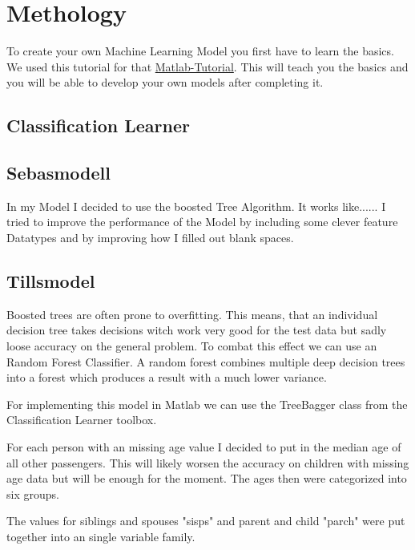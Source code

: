 \documentclass[
   10.5pt,
   invert-title=true,
   titlepage=false,
   titleimage-ratio=13,
   class=article
]{bfhpub}				%
\begin{document}
\section*{Methology}
To create your own Machine Learning Model you first have to learn the basics. We used this tutorial for that \href{https://blogs.mathworks.com/loren/2015/06/18/getting-started-with-kaggle-data-science-competitions/}{Matlab-Tutorial}.
This will teach you the basics and you will be able to develop your own models after completing it.

\subsection*{Classification Learner}

\subsection*{Sebasmodell}
In my Model I decided to use the boosted Tree Algorithm. It works like......
I tried to improve the performance of the Model by including some clever feature Datatypes and by improving how I filled out blank spaces.

\subsection*{Tillsmodel}
Boosted trees are often prone to overfitting. This means, that an individual decision tree takes decisions witch work very good for the test data but sadly loose accuracy on the general problem.
To combat this effect we can use an Random Forest Classifier. A random forest  combines multiple deep decision trees into a forest which produces a result with a much lower variance.

For implementing this model in Matlab we can use the TreeBagger class from the Classification Learner toolbox.

For each person with an missing age value I decided to put in the median age of all other passengers. This will likely worsen the accuracy on children with missing age data but will be enough for the moment. The ages then were categorized into six groups.

The values for siblings and spouses "sisps" and parent and child "parch" were put together into an single variable family. \newline
\end{document}
